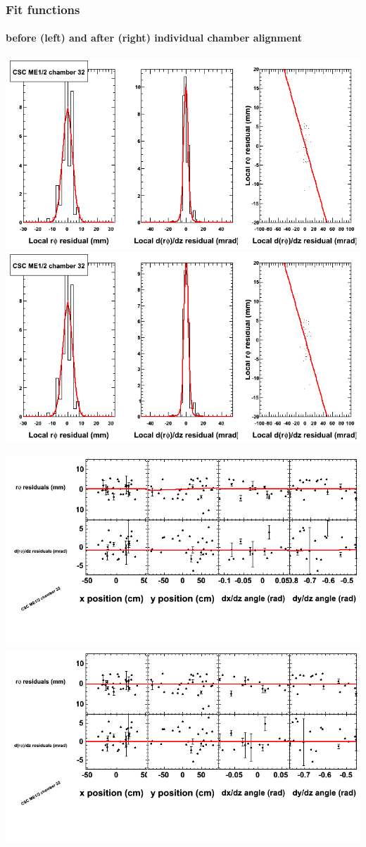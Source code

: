 \documentclass[compress]{beamer}
\begin{document}
\begin{frame}
\frametitle{Fit functions}
\framesubtitle{before (left) and after (right) individual chamber alignment}
\includegraphics[width=0.5\linewidth]{ringfits_3dof/beforefit_MEp12_32_bellcurve.png} \includegraphics[width=0.5\linewidth]{ringfits_3dof/afterfit_MEp12_32_bellcurve.png}

\includegraphics[width=0.5\linewidth]{ringfits_3dof/beforefit_MEp12_32_polynomials.png} \includegraphics[width=0.5\linewidth]{ringfits_3dof/afterfit_MEp12_32_polynomials.png}
\end{frame}
\end{document}
